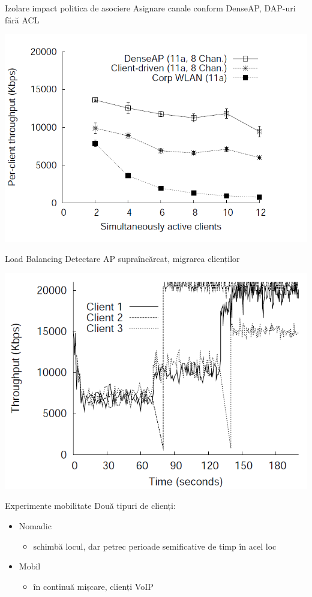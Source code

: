 \begin{frame}{Izolare impact politica de asociere}
  Asignare canale conform DenseAP, DAP-uri fără ACL
  \begin{center}
    \includegraphics[scale=0.35]{img/fig13.png}
  \end{center}
\end{frame}

\begin{frame}{Load Balancing}
  Detectare AP supraîncărcat, migrarea clienților
  \begin{center}
    \includegraphics[scale=0.35]{img/fig18.png}
  \end{center}
\end{frame}

\begin{frame}{Experimente mobilitate}
  Două tipuri de clienți:
  \begin{itemize}
    \item Nomadic
    \begin{itemize}
      \item schimbă locul, dar petrec perioade semificative de timp în acel loc
    \end{itemize}
    \item Mobil
    \begin{itemize}
      \item în continuă mișcare, clienți VoIP
    \end{itemize}
  \end{itemize}
\end{frame}

